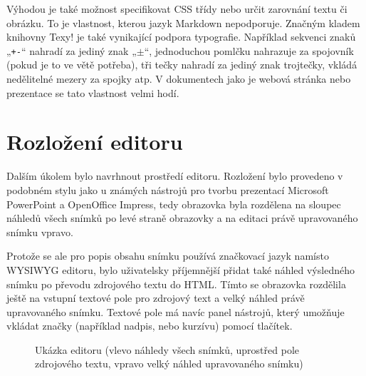 \documentclass[11pt,twoside,a4paper]{book}
\begin{document}
Výhodou je také možnost specifikovat CSS třídy nebo určit zarovnání textu či obrázku. To je vlastnost, kterou jazyk Markdown nepodporuje. Značným kladem knihovny Texy! je také vynikající podpora typografie. Například sekvenci znaků „\lstinline|+-|“ nahradí za jediný znak „$\pm$“, jednoduchou pomlčku nahrazuje za spojovník (pokud je to ve větě potřeba), tři tečky nahradí za jediný znak trojtečky, vkládá nedělitelné mezery za spojky atp. V dokumentech jako je webová stránka nebo prezentace se tato vlastnost velmi hodí.


\section{Rozložení editoru}
Dalším úkolem bylo navrhnout prostředí editoru. Rozložení bylo provedeno v podobném stylu jako u známých nástrojů pro tvorbu prezentací Microsoft PowerPoint a OpenOffice Impress, tedy obrazovka byla rozdělena na sloupec náhledů všech snímků po levé straně obrazovky a na editaci právě upravovaného snímku vpravo.

Protože se ale pro popis obsahu snímku používá značkovací jazyk namísto WYSIWYG editoru, bylo uživatelsky příjemnější přidat také náhled výsledného snímku po převodu zdrojového textu do HTML. Tímto se obrazovka rozdělila ještě na vstupní textové pole pro zdrojový text a velký náhled právě upravovaného snímku. Textové pole má navíc panel nástrojů, který umožňuje vkládat značky (například nadpis, nebo kurzívu) pomocí tlačítek.

\begin{figure}[ht]
	\begin{center}
		\caption[Ukázka editoru]{Ukázka editoru (vlevo náhledy všech snímků, uprostřed pole zdrojového textu, vpravo velký náhled upravovaného snímku)}
		\label{fig:editorLayout}
	\end{center}
\end{figure}
\end{document}
